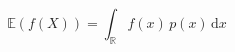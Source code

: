 \documentclass[preview]{standalone}
\begin{document}
\begin{equation}
\tag{17}
    \mathbb{E} ( f ( X ) ) = \int_{\mathbb{R}} f ( x ) \, p ( x ) \, \mathrm{d}x
\end{equation}
\end{document}
